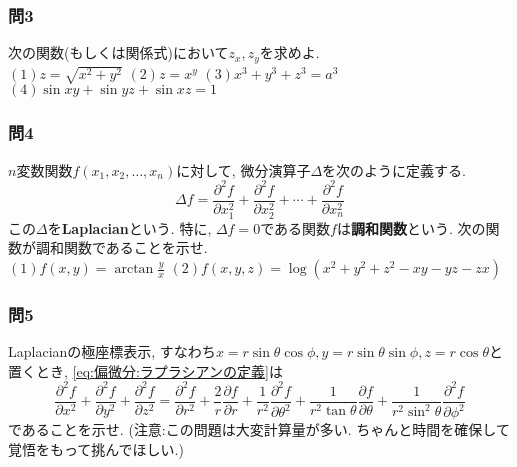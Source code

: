     \subsubsection*{問3}次の関数(もしくは関係式)において$z_x,z_y$を求めよ.\\
        $(1)z=\sqrt{x^2+y^2}$\hspace{1mm}
        $(2)z=x^{y}$\hspace{1mm}
        $(3)x^3+y^3+z^3=a^3$\hspace{1mm}
        $(4)\sin xy+\sin yz+ \sin xz = 1$
    
    \subsubsection*{問4}$n$変数関数$f(x_1,x_2,\dots,x_n)$に対して, 微分演算子$\Delta$を次のように定義する.
        \begin{equation}
            \Delta f = \frac{\partial^2f}{\partial x_1^2}+\frac{\partial^2f}{\partial x_2^2}+\cdots+\frac{\partial^2f}{\partial x_n^2} \label{eq:偏微分:ラプラシアンの定義}
        \end{equation}
        この$\Delta$を\textbf{Laplacian}という. 特に, $\Delta f= 0$である関数$f$は\textbf{調和関数}という.
        次の関数が調和関数であることを示せ.\\
        $\displaystyle(1)f(x,y)=\arctan\frac{y}{x}$\hspace{10mm}
        $(2)f(x,y,z)=\log(x^2+y^2+z^2-xy-yz-zx)$

    \subsubsection*{問5}Laplacianの極座標表示, すなわち$x=r\sin\theta\cos\phi,y=r\sin\theta\sin\phi,z=r\cos\theta$と置くとき, \eqref{eq:偏微分:ラプラシアンの定義}は
    \begin{equation}
        \frac{\partial^2 f}{\partial x^2}+\frac{\partial^2 f}{\partial y^2}+\frac{\partial^2 f}{\partial z^2}=\frac{\partial^2 f}{\partial r^2}+\frac{2}{r}\frac{\partial f}{\partial r}+
        \frac{1}{r^2}\frac{\partial^2 f}{\partial\theta^2}+\frac{1}{r^2\tan\theta}\frac{\partial f}{\partial\theta}+\frac{1}{r^2\sin^2\theta}\frac{\partial^2 f}{\partial\phi^2} \label{eq:偏微分:ラプラシアンの極座標変換}
    \end{equation}
    であることを示せ. ({\small\color{red}注意:この問題は大変計算量が多い. ちゃんと時間を確保して覚悟をもって挑んでほしい.})

